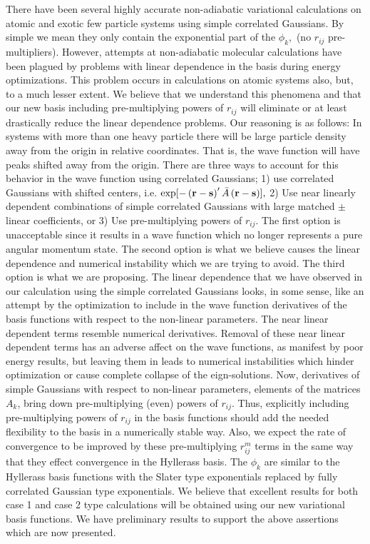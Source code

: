\documentclass[12pt,thmsa]{article}
\begin{document}
There have been several highly accurate non-adiabatic variational
calculations on atomic and exotic few particle systems using simple
correlated Gaussians\cite
{Kinghorn93,Kinghorn95b,Kozlowski93b,Kinghorn96a,Varga96}. By simple we mean
they only contain the exponential part of the $\phi _k,$ (no $r_{ij}$
pre-multipliers). However, attempts at non-adiabatic molecular calculations
have been plagued by problems with linear dependence in the basis during
energy optimizations. This problem occurs in calculations on atomic systems
also, but, to a much lesser extent. We believe that we understand this
phenomena and that our new basis including pre-multiplying powers of $r_{ij}$
will eliminate or at least drastically reduce the linear dependence
problems. Our reasoning is as follows: In systems with more than one heavy
particle there will be large particle density away from the origin in
relative coordinates. That is, the wave function will have peaks shifted
away from the origin. There are three ways to account for this behavior in
the wave function using correlated Gaussians; 1) use correlated Gaussians
with shifted centers, i.e. $\exp [-\left( \mathbf{r-s}\right) ^{\prime }\bar{%
A}\left( \mathbf{r-s}\right) ],$ 2) Use near linearly dependent combinations
of simple correlated Gaussians with large matched $\pm $ linear
coefficients, or 3) Use pre-multiplying powers of $r_{ij}$. The first option
is unacceptable since it results in a wave function which no longer
represents a pure angular momentum state. The second option is what we
believe causes the linear dependence and numerical instability which we are
trying to avoid. The third option is what we are proposing. The linear
dependence that we have observed in our calculation using the simple
correlated Gaussians looks, in some sense, like an attempt by the
optimization to include in the wave function derivatives of the basis
functions with respect to the non-linear parameters. The near linear
dependent terms resemble numerical derivatives. Removal of these near linear
dependent terms has an adverse affect on the wave functions, as manifest by
poor energy results, but leaving them in leads to numerical instabilities
which hinder optimization or cause complete collapse of the eign-solutions.
Now, derivatives of simple Gaussians with respect to non-linear parameters,
elements of the matrices $A_k$, bring down pre-multiplying (even) powers of $%
r_{ij}$. Thus, explicitly including pre-multiplying powers of $r_{ij}$ in
the basis functions should add the needed flexibility to the basis in a
numerically stable way. Also, we expect the rate of convergence to be
improved by these pre-multiplying $r_{ij}^m$ terms in the same way that they
effect convergence in the Hyllerass basis. The $\phi _k$ are similar to the
Hyllerass basis functions with the Slater type exponentials replaced by
fully correlated Gaussian type exponentials. We believe that excellent
results for both case 1 and case 2 type calculations will be obtained using
our new variational basis functions. We have preliminary results to support
the above assertions which are now presented.
\end{document}
